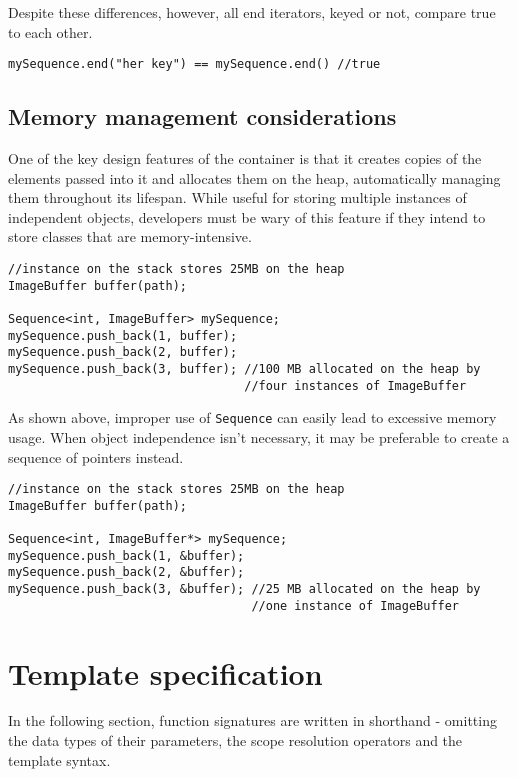 ﻿\documentclass{article}
\begin{document}
Despite these differences, however, all end iterators, keyed or not, compare
true to each other.

\begin{verbatim}
mySequence.end("her key") == mySequence.end() //true
\end{verbatim}

\subsection{Memory management considerations}

One of the key design features of the container is that it creates copies
of the elements passed into it and allocates them on the heap, automatically
managing them throughout its lifespan. While useful for storing multiple
instances of independent objects, developers must be wary of this feature if
they intend to store classes that are memory-intensive.

\begin{verbatim}
//instance on the stack stores 25MB on the heap
ImageBuffer buffer(path);

Sequence<int, ImageBuffer> mySequence;
mySequence.push_back(1, buffer);
mySequence.push_back(2, buffer);
mySequence.push_back(3, buffer); //100 MB allocated on the heap by
                                 //four instances of ImageBuffer
\end{verbatim}

As shown above, improper use of {\tt Sequence} can easily lead to excessive
memory usage. When object independence isn't necessary, it may be preferable
to create a sequence of pointers instead.

\begin{verbatim}
//instance on the stack stores 25MB on the heap
ImageBuffer buffer(path);

Sequence<int, ImageBuffer*> mySequence;
mySequence.push_back(1, &buffer);
mySequence.push_back(2, &buffer);
mySequence.push_back(3, &buffer); //25 MB allocated on the heap by
                                  //one instance of ImageBuffer
\end{verbatim}

\section{Template specification}

In the following section, function signatures are written in shorthand -
omitting the data types of their parameters, the scope resolution operators and
the template syntax.
\end{document}
